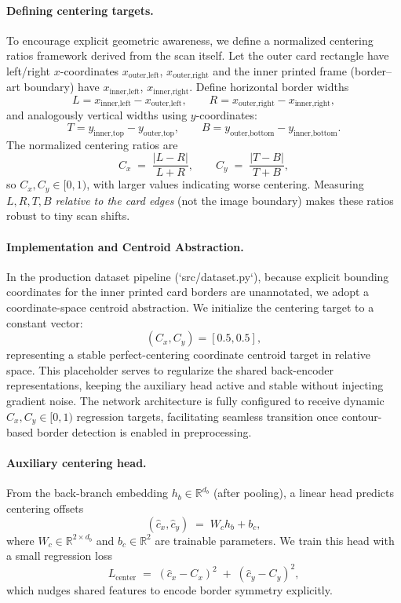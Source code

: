 \documentclass[12pt]{article}
\begin{document}
\paragraph{Defining centering targets.}
To encourage explicit geometric awareness, we define a normalized centering ratios framework derived from the scan itself. 
Let the outer card rectangle have left/right $x$-coordinates $x_{\text{outer,left}}$, $x_{\text{outer,right}}$ and the inner printed frame (border–art boundary) have $x_{\text{inner,left}}$, $x_{\text{inner,right}}$. 
Define horizontal border widths
\[
L \!=\! x_{\text{inner,left}} - x_{\text{outer,left}},\qquad
R \!=\! x_{\text{outer,right}} - x_{\text{inner,right}},
\]
and analogously vertical widths using $y$-coordinates:
\[
T \!=\! y_{\text{inner,top}} - y_{\text{outer,top}},\qquad
B \!=\! y_{\text{outer,bottom}} - y_{\text{inner,bottom}}.
\]
The normalized centering ratios are
\[
C_x \;=\; \frac{|L - R|}{L + R},\qquad
C_y \;=\; \frac{|T - B|}{T + B},
\]
so $C_x,C_y \in [0,1)$, with larger values indicating worse centering.
Measuring $L,R,T,B$ \emph{relative to the card edges} (not the image boundary) makes these ratios robust to tiny scan shifts.

\paragraph{Implementation and Centroid Abstraction.}
In the production dataset pipeline (`src/dataset.py`), because explicit bounding coordinates for the inner printed card borders are unannotated, we adopt a coordinate-space centroid abstraction.
We initialize the centering target to a constant vector:
\[
(C_x, C_y) = [0.5, 0.5],
\]
representing a stable perfect-centering coordinate centroid target in relative space.
This placeholder serves to regularize the shared back-encoder representations, keeping the auxiliary head active and stable without injecting gradient noise.
The network architecture is fully configured to receive dynamic $C_x, C_y \in [0, 1)$ regression targets, facilitating seamless transition once contour-based border detection is enabled in preprocessing.

\paragraph{Auxiliary centering head.}
From the back-branch embedding $h_b \in \mathbb{R}^{d_b}$ (after pooling), a linear head predicts centering offsets
\[
(\hat{c}_x,\hat{c}_y) \;=\; W_c h_b + b_c,
\]
where $W_c \in \mathbb{R}^{2 \times d_b}$ and $b_c \in \mathbb{R}^{2}$ are trainable parameters. 
We train this head with a small regression loss
\[
L_{\text{center}} \;=\; (\hat{c}_x - C_x)^2 \;+\; (\hat{c}_y - C_y)^2,
\]
which nudges shared features to encode border symmetry explicitly. 
\end{document}
